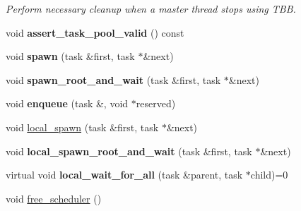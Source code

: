 \begin{DoxyCompactItemize}
\begin{DoxyCompactList}\small\item\em Perform necessary cleanup when a master thread stops using T\+B\+B. \end{DoxyCompactList}\item 
\hypertarget{classtbb_1_1internal_1_1generic__scheduler_a08edecb9bd9ef648bada9fb5b1febeec}{}void {\bfseries assert\+\_\+task\+\_\+pool\+\_\+valid} () const \label{classtbb_1_1internal_1_1generic__scheduler_a08edecb9bd9ef648bada9fb5b1febeec}

\item 
\hypertarget{classtbb_1_1internal_1_1generic__scheduler_a1a08aff3876258352d0042703abffeed}{}void {\bfseries spawn} (task \&first, task $\ast$\&next)\label{classtbb_1_1internal_1_1generic__scheduler_a1a08aff3876258352d0042703abffeed}

\item 
\hypertarget{classtbb_1_1internal_1_1generic__scheduler_ab2396d7d9f7338d838e9ef3c9cad963e}{}void {\bfseries spawn\+\_\+root\+\_\+and\+\_\+wait} (task \&first, task $\ast$\&next)\label{classtbb_1_1internal_1_1generic__scheduler_ab2396d7d9f7338d838e9ef3c9cad963e}

\item 
\hypertarget{classtbb_1_1internal_1_1generic__scheduler_a6cdf48713a00843b7b51977c8ffc77a9}{}void {\bfseries enqueue} (task \&, void $\ast$reserved)\label{classtbb_1_1internal_1_1generic__scheduler_a6cdf48713a00843b7b51977c8ffc77a9}

\item 
void \hyperlink{classtbb_1_1internal_1_1generic__scheduler_a1abff4996f1d77c35f30aaa31b9d6084}{local\+\_\+spawn} (task \&first, task $\ast$\&next)
\item 
\hypertarget{classtbb_1_1internal_1_1generic__scheduler_aa976700664443eb85675f0eb91812400}{}void {\bfseries local\+\_\+spawn\+\_\+root\+\_\+and\+\_\+wait} (task \&first, task $\ast$\&next)\label{classtbb_1_1internal_1_1generic__scheduler_aa976700664443eb85675f0eb91812400}

\item 
\hypertarget{classtbb_1_1internal_1_1generic__scheduler_a509997dbb9b97ad2cca0a3af76c04e90}{}virtual void {\bfseries local\+\_\+wait\+\_\+for\+\_\+all} (task \&parent, task $\ast$child)=0\label{classtbb_1_1internal_1_1generic__scheduler_a509997dbb9b97ad2cca0a3af76c04e90}

\item 
\hypertarget{classtbb_1_1internal_1_1generic__scheduler_a66e6dd672693eb34cd6fd46ed7a7c6a6}{}void \hyperlink{classtbb_1_1internal_1_1generic__scheduler_a66e6dd672693eb34cd6fd46ed7a7c6a6}{free\+\_\+scheduler} ()\label{classtbb_1_1internal_1_1generic__scheduler_a66e6dd672693eb34cd6fd46ed7a7c6a6}


\end{DoxyCompactItemize}
